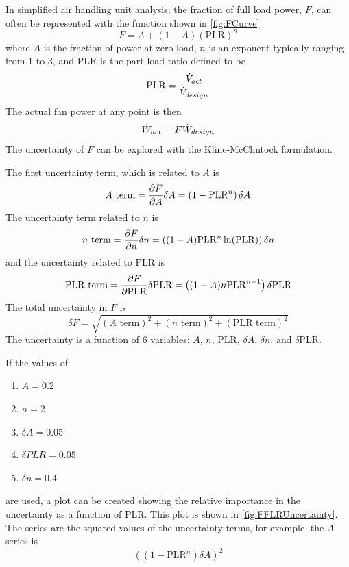 In simplified air handling unit analysis, the fraction of full load
power, \(F\), can often be represented with the function shown in
\figref{} \ref{fig:FCurve}
\begin{equation}
    F = A + (1-A)( \text{PLR} )^{n}
\end{equation}
where \(A\) is the fraction of power at zero load, \(n\) is an exponent
typically ranging from 1 to 3, and PLR is the part load
ratio defined to be
\begin{equation}
    \text{PLR} = \frac{\dot{V}_{act}}{\dot{V}_{design}}
\end{equation}
The actual fan power at any point is then
\begin{equation}
    \dot{W}_{act}  = F \dot{W}_{design}
\end{equation}
The uncertainty of \(F\) can be explored with the Kline-McClintock
formulation.

The first uncertainty term, which is related to \(A\) is
\begin{equation}
A \text{ term} = \pdv{F}{A} \delta A = \left(1-\text{PLR}^n\right) \delta A
\end{equation}
The uncertainty term related to \(n\) is
\begin{equation}
    n \text{ term} = \pdv{F}{n} \delta n = \left((1-A) \text{PLR}^n \ln (\text{PLR})\right) \delta n
\end{equation}
and the uncertainty related to PLR is
\begin{equation}
    \text{PLR term} = \pdv{F}{ \text{PLR}} \delta \text{PLR} = \left((1-A) n \text{PLR}^{n-1}\right) \delta \text{PLR}
\end{equation}
The total uncertainty in \(F\) is
\begin{equation}
    \delta F = \sqrt{ \left(A \text{ term}\right)^{2} + \left(n \text{ term}\right)^{2} + \left( \text{PLR term}\right)^{2} }
\end{equation}
The uncertainty is a function of 6 variables: \(A\), \(n\), PLR, \(\delta A\), \(\delta n\), and \(\delta\)PLR.

If the values of
\begin{enumerate}
    \item \(A=0.2\)
    \item \(n=2\)
    \item \(\delta A = 0.05\)
    \item \(\delta PLR = 0.05\)
    \item \(\delta n = 0.4\)
\end{enumerate}
are used, a plot can be created showing the relative importance in the
uncertainty as a function of PLR. This plot is shown in \figref{}
\ref{fig:FFLRUncertainty}. The series are the squared values of the
uncertainty terms, for example, the \(A\) series is 
\begin{equation}
    \left(\left(1-\text{PLR}^n\right) \delta A\right)^{2}
\end{equation}

